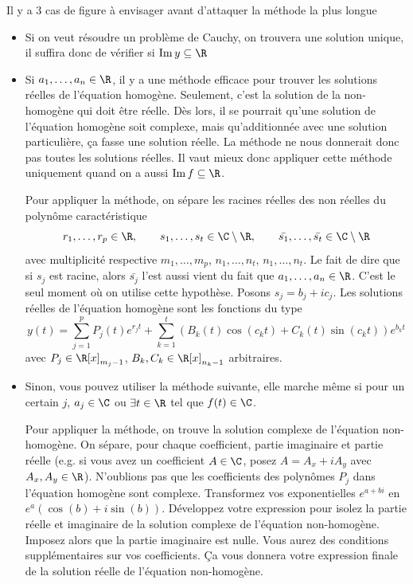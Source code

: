 Il y a 3 cas de figure à envisager avant d'attaquer la méthode la plus longue
\begin{itemize}
	\item Si on veut résoudre un problème de Cauchy, on trouvera une solution unique,
		il suffira donc de vérifier si $\newim y \subseteq \R$
	\item Si $a_1, \dots, a_n \in \R$,
		il y a une méthode efficace pour trouver les solutions réelles de l'équation homogène.
		Seulement, c'est la solution de la non-homogène qui doit être réelle.
		Dès lors, il se pourrait qu'une solution de l'équation homogène soit complexe,
		mais qu'additionnée avec une solution particulière, ça fasse une solution réelle.
		La méthode ne nous donnerait donc pas toutes les solutions réelles.
		Il vaut mieux donc appliquer cette méthode uniquement quand on a aussi $\newim f \subseteq \R$.

		Pour appliquer la méthode, on sépare les racines réelles des non réelles du polynôme caractéristique
		\[ r_1, \dots, r_p \in \R, \qquad s_1, \dots, s_t \in \C \setminus \R, \qquad
		\bar{s_1}, \dots, \bar{s_t} \in \C \setminus \R \]
		avec multiplicité respective $m_1, \dots, m_p$, $n_1, \dots, n_t$, $n_1, \dots, n_t$.
		Le fait de dire que si $s_j$ est racine, alors $\bar{s_j}$ l'est aussi vient du fait que $a_1, \dots, a_n \in \R$.
		C'est le seul moment où on utilise cette hypothèse.
		Posons $s_j = b_j + ic_j$.
		Les solutions réelles de l'équation homogène sont les fonctions du type
		\[ y(t) = \sum_{j = 1}^p P_j(t)e^{r_jt} + \sum_{k=1}^t(B_k(t)\cos(c_kt)+C_k(t)\sin(c_kt))e^{b_kt} \]
		avec $P_j \in \R[x]_{m_j-1}$, $B_k, C_k \in \R[x]_{n_k-1}$ arbitraires.
	\item Sinon, vous pouvez utiliser la méthode suivante,
		elle marche même si pour un certain $j$, $a_j \in \C$ ou $\exists t \in \R$ tel que $f(t) \in \C$.

		Pour appliquer la méthode, on trouve la solution complexe de l'équation non-homogène.
		On sépare, pour chaque coefficient, partie imaginaire et partie réelle
		(e.g. si vous avez un coefficient $A \in \C$, posez $A = A_x + iA_y$ avec $A_x, A_y \in \R$).
		N'oublions pas que les coefficients des polynômes $P_j$ dans l'équation homogène sont complexe.
		Transformez vos exponentielles $e^{a + bi}$ en $e^a(\cos(b) + i\sin(b))$.
		Développez votre expression pour isolez la partie réelle et imaginaire de la solution complexe de l'équation non-homogène.
		Imposez alors que la partie imaginaire est nulle.
		Vous aurez des conditions supplémentaires sur vos coefficients.
		Ça vous donnera votre expression finale de la solution réelle de l'équation non-homogène.
\end{itemize}

